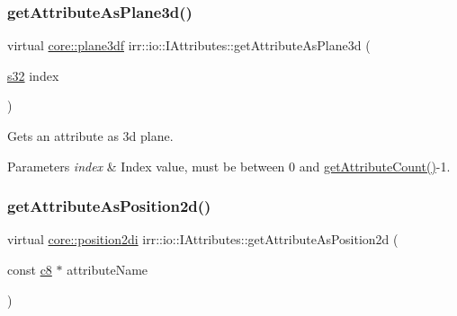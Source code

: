 \subsubsection{\texorpdfstring{get\+Attribute\+As\+Plane3d()}{getAttributeAsPlane3d()}\hspace{0.1cm}{\footnotesize\ttfamily [4/4]}}
{\footnotesize\ttfamily virtual \hyperlink{namespaceirr_1_1core_a97c9b39d4c6f71dbd9ded0153c4fa7f7}{core\+::plane3df} irr\+::io\+::\+I\+Attributes\+::get\+Attribute\+As\+Plane3d (\begin{DoxyParamCaption}\item[{\hyperlink{namespaceirr_ac66849b7a6ed16e30ebede579f9b47c6}{s32}}]{index }\end{DoxyParamCaption})\hspace{0.3cm}{\ttfamily [pure virtual]}}



Gets an attribute as 3d plane. 


\begin{DoxyParams}{Parameters}
{\em index} & Index value, must be between 0 and \hyperlink{classirr_1_1io_1_1IAttributes_a796bdd9440ee7ba0b6742a90a82870b6}{get\+Attribute\+Count()}-\/1. \\
\hline
\end{DoxyParams}
\mbox{\label{classirr_1_1io_1_1IAttributes_abedde01b678c482be20735e4d730942f}} 
\subsubsection{\texorpdfstring{get\+Attribute\+As\+Position2d()}{getAttributeAsPosition2d()}\hspace{0.1cm}{\footnotesize\ttfamily [1/4]}}
{\footnotesize\ttfamily virtual \hyperlink{namespaceirr_1_1core_ace0f1379db5f9f5660456ec57ab78202}{core\+::position2di} irr\+::io\+::\+I\+Attributes\+::get\+Attribute\+As\+Position2d (\begin{DoxyParamCaption}\item[{const \hyperlink{namespaceirr_a9395eaea339bcb546b319e9c96bf7410}{c8} $\ast$}]{attribute\+Name }\end{DoxyParamCaption})\hspace{0.3cm}{\ttfamily [pure virtual]}}



